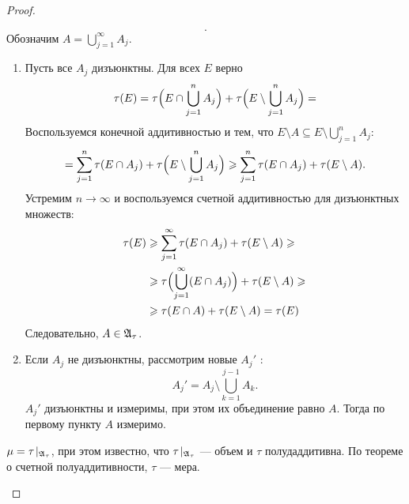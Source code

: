 \begin{proof}
\begin{enumerate}
\[			.\] 
			Обозначим $ A = \bigcup\limits_{j=1}^{\infty} A_j$.
			\begin{enumerate}
			    \item Пусть все $ A_j$ дизъюнктны. Для всех $ E$ верно
					 \[
						 \tau (E) = \tau \Bigl(E \cap \bigcup_{j=1}^{n} A_j\Bigr) + \tau \Bigl( E \setminus \bigcup_{j=1}^{n} A_j\Bigr) =
					\] 
					Воспользуемся конечной аддитивностью и тем, что $ E \setminus A \subseteq E \setminus \bigcup\limits_{j=1}^{n} A_j$:
					\[
						= \sum_{j=1}^{n} \tau (E \cap A_j) + \tau \Bigl( E \setminus \bigcup_{j=1}^{n} A_j\Bigr) \ge \sum_{j=1}^{n} \tau ( E \cap A_j) + \tau (E \setminus A)
					.\] 
					Устремим $ n \to  \infty $ и воспользуемся счетной аддитивностью для дизъюнктных множеств:
					\[
					\begin{aligned}
						\tau (E) &\ge  \sum_{j=1}^{\infty} \tau (E \cap A_j) + \tau (E \setminus A) \ge \\
								 & \ge \tau \Bigl( \bigcup_{j=1}^{\infty} (E \cap A_j)\Bigr) + \tau (E \setminus A) \ge  \\
								 & \ge  \tau (E \cap A) + \tau (E \setminus A) = \tau (E)
					\end{aligned}
					\]
					Следовательно, $ A \in \A_{\tau }$.
				\item Если $ A_j$ не дизъюнктны, рассмотрим новые $ A_j'$ :
					 \[
					 A_{j}' = A_j \setminus \bigcup_{k=1}^{j-1} A_k
					 .\] 
					 $ A_j'$ дизъюнктны и измеримы, при этом их объединение равно $A$. Тогда по первому пункту  $ A$ измеримо.
			\end{enumerate} 
		$ \mu = \tau \!\mid_{\A_{\tau }}$, при этом известно, что $ \tau \!\mid_{\A_{\tau }}$ --- объем и $ \tau $ полудаддитивна. По теореме о счетной полуаддитивности, $ \tau $ --- мера.
    \end{enumerate} 
\end{proof}
